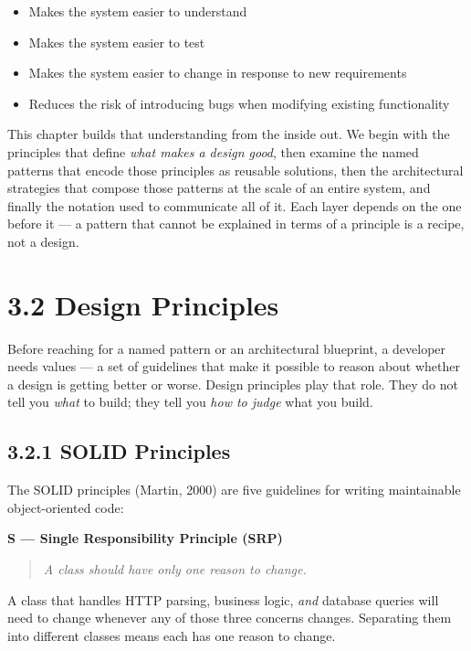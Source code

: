 \documentclass[11pt,a4paper]{book}
\begin{document}
\begin{itemize}
  \item Makes the system easier to understand
  \item Makes the system easier to test
  \item Makes the system easier to change in response to new requirements
  \item Reduces the risk of introducing bugs when modifying existing functionality
\end{itemize}

This chapter builds that understanding from the inside out. We begin with the principles that define \textit{what makes a design good}, then examine the named patterns that encode those principles as reusable solutions, then the architectural strategies that compose those patterns at the scale of an entire system, and finally the notation used to communicate all of it. Each layer depends on the one before it --- a pattern that cannot be explained in terms of a principle is a recipe, not a design.

\medskip

\section{3.2 Design Principles}

Before reaching for a named pattern or an architectural blueprint, a developer needs values --- a set of guidelines that make it possible to reason about whether a design is getting better or worse. Design principles play that role. They do not tell you \textit{what} to build; they tell you \textit{how to judge} what you build.

\subsection{3.2.1 SOLID Principles}

The SOLID principles (Martin, 2000) are five guidelines for writing maintainable object-oriented code:

\textbf{S --- Single Responsibility Principle (SRP)}

\begin{quote}
\textit{A class should have only one reason to change.}
\end{quote}

A class that handles HTTP parsing, business logic, \textit{and} database queries will need to change whenever any of those three concerns changes. Separating them into different classes means each has one reason to change.
\end{document}
